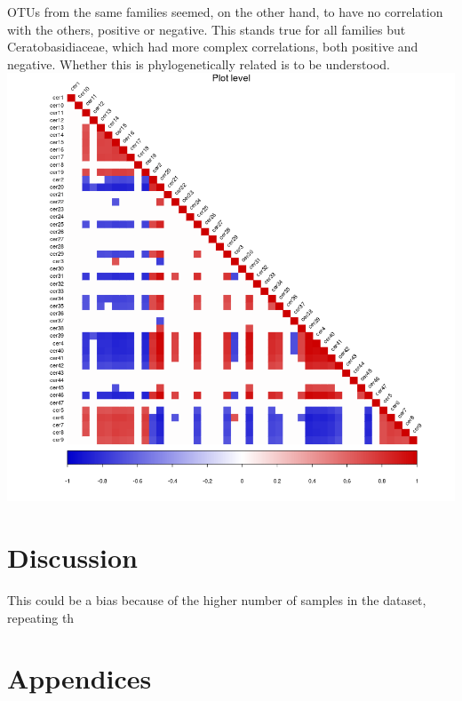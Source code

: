 OTUs from the same families seemed, on the other hand, to have no correlation with the others, positive or negative. This stands true for all families but Ceratobasidiaceae, which had more complex correlations, both positive and negative. Whether this is phylogenetically related is to be understood. \includegraphics[keepaspectratio,width=\textwidth,height=0.75\textheight]{images/corrCer.png}

\part{Discussion}
\label{discussion}

This could be a bias because of the higher number of samples in the dataset, repeating th

\part{Appendices}
\label{appendices}

